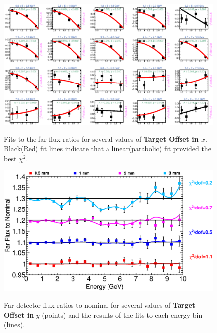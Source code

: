 {\begin{figure}[ht]
  \begin{center}
    {\includegraphics[width=5.0in]{figures/TargetXOffset_far_fits.eps}}
  \end{center}
\caption{ Fits to the far flux ratios for several values of {\bf Target Offset in $x$}. Black(Red) fit lines indicate that a linear(parabolic) fit provided the best $\chi^2$. }
\end{figure}

\begin{figure}[ht]
  \begin{center}
    {\includegraphics[width=6.0in]{figures/TargetYOffset_far_summary.eps}}
  \end{center}
\caption{ Far detector flux ratios to nominal for several values of {\bf Target Offset in $y$} (points) and the results of the fits to each energy bin (lines).}
\end{figure}

}
